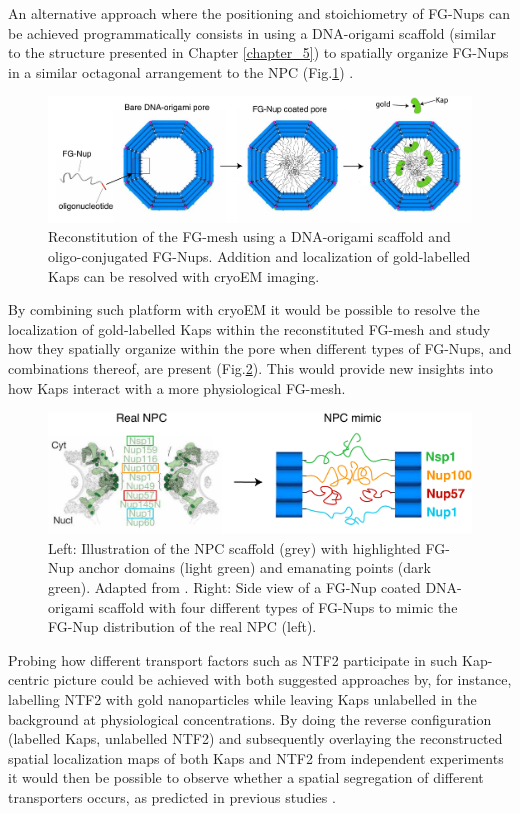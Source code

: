 An alternative approach where the positioning and stoichiometry of FG-Nups can be achieved programmatically consists in using a DNA-origami scaffold (similar to the structure presented in Chapter \ref{chapter_5}) to spatially organize FG-Nups in a similar octagonal arrangement to the NPC (Fig.\ref{fig:fig8.4}) \cite{Ketterer2018,Fisher2018}.
\begin{figure}[!htbp]
	\centering
	\includegraphics[width=1\linewidth]{figures/Figure8.4.pdf}
	\caption{Reconstitution of the FG-mesh using a DNA-origami scaffold and oligo-conjugated FG-Nups. Addition and localization of gold-labelled Kaps can be resolved with cryoEM imaging.}
	\label{fig:fig8.4}
\end{figure}
By combining such platform with cryoEM it would be possible to resolve the localization of gold-labelled Kaps within the reconstituted FG-mesh and study how they spatially organize within the pore when different types of FG-Nups, and combinations thereof, are present (Fig.\ref{fig:fig8.5}). This would provide new insights into how Kaps interact with a more physiological FG-mesh. 
\begin{figure}[!htbp]
	\centering
	\includegraphics[width=0.9\linewidth]{figures/Figure8.5.pdf}
	\caption{Left: Illustration of the NPC scaffold (grey) with highlighted FG-Nup anchor domains (light green) and emanating points (dark green). Adapted from \cite{Kim2018}. Right: Side view of a FG-Nup coated DNA-origami scaffold with four different types of FG-Nups to mimic the FG-Nup distribution of the real NPC (left).}
	\label{fig:fig8.5}
\end{figure}

Probing how different transport factors such as NTF2 participate in such Kap-centric picture could be achieved with both suggested approaches by, for instance, labelling NTF2 with gold nanoparticles while leaving Kaps unlabelled in the background at physiological concentrations. By doing the reverse configuration (labelled Kaps, unlabelled NTF2) and subsequently overlaying the reconstructed spatial localization maps of both Kaps and NTF2 from independent experiments it would then be possible to observe whether a spatial segregation of different transporters occurs, as predicted in previous studies \cite{Davis2021,Wagner2015}. 

